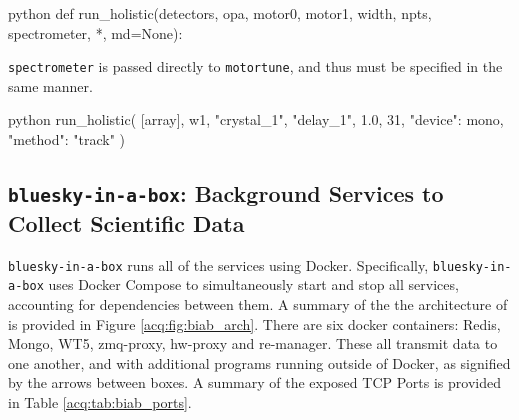 \begin{codefragment}{python}
def run_holistic(detectors, opa, motor0, motor1, width, npts, spectrometer, *, md=None):
\end{codefragment}

\texttt{spectrometer} is passed directly to \texttt{motortune}, and thus must be specified in the same manner.

\begin{codefragment}{python}
run_holistic(
    [array],
    w1,
    "crystal_1",
    "delay_1",
    1.0,
    31,
    {"device": mono, "method": "track"}
)
\end{codefragment}


\subsection{\texttt{bluesky-in-a-box}: Background Services to Collect Scientific Data}

\texttt{bluesky-in-a-box} runs all of the services using Docker\cite{}.
Specifically, \texttt{bluesky-in-a-box} uses Docker Compose\cite{} to simultaneously start and stop all services, accounting for dependencies between them.
A summary of the the architecture of \biab{} is provided in Figure \ref{acq:fig:biab_arch}.
There are six docker containers: Redis, Mongo, WT5, zmq-proxy, hw-proxy and re-manager.
These all transmit data to one another, and with additional programs running outside of Docker, as signified by the arrows between boxes.
A summary of the exposed TCP Ports is provided in Table \ref{acq:tab:biab_ports}.


